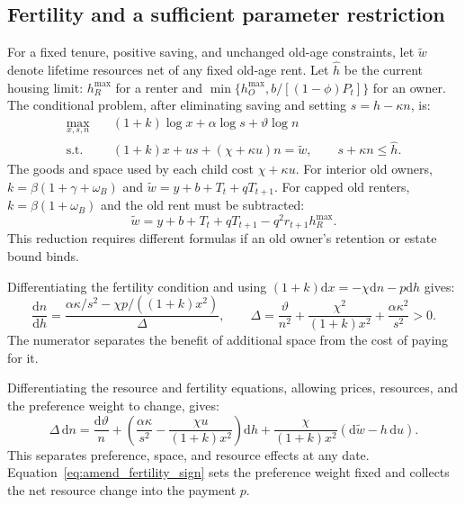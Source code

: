 \documentclass[11pt]{article}
\newcommand{\dd}{\mathrm d}
\begin{document}
\subsection{Fertility and a sufficient parameter restriction}
\label{app:amend_fertility}

For a fixed tenure, positive saving, and unchanged old-age constraints,
let $\widetilde w$ denote lifetime resources net of any fixed old-age rent.
Let $\widehat h$ be the current housing limit: $h_R^{\max}$ for a renter
and $\min\{h_O^{\max},b/[(1-\phi)P_t]\}$ for an owner. The conditional
problem, after eliminating saving and setting $s=h-\kappa n$, is:
\begin{equation}
 \begin{aligned}
 \max_{x,s,n}\quad &(1+k)\log x+\alpha\log s+\vartheta\log n\\
 \text{s.t.}\quad &(1+k)x+u s+(\chi+\kappa u)n=\widetilde w,
 \qquad s+\kappa n\leq\widehat h.
 \end{aligned}
 \label{eq:amend_reduced_problem}
\end{equation}
The goods and space used by each child cost $\chi+\kappa u$.
For interior old owners, $k=\beta(1+\gamma+\omega_B)$ and
$\widetilde w=y+b+T_t+qT_{t+1}$. For capped old renters,
$k=\beta(1+\omega_B)$ and the old rent must be subtracted:
\begin{equation}
 \widetilde w=y+b+T_t+qT_{t+1}-q^2r_{t+1}h_R^{\max}.
 \label{eq:amend_capped_old}
\end{equation}
This reduction requires different formulas if an old owner's retention or
estate bound binds.

Differentiating the fertility condition and using
$(1+k)\dd x=-\chi\dd n-p\dd h$ gives:
\begin{equation}
 \frac{\dd n}{\dd h}
 =\frac{\alpha\kappa/s^2-\chi p/((1+k)x^2)}{\Delta},\qquad
 \Delta=\frac{\vartheta}{n^2}+\frac{\chi^2}{(1+k)x^2}
              +\frac{\alpha\kappa^2}{s^2}>0.
 \label{eq:amend_fertility_sign}
\end{equation}
The numerator separates the benefit of additional space from the cost of
paying for it.

Differentiating the resource and fertility equations, allowing prices,
resources, and the preference weight to change, gives:
\begin{equation}
 \Delta\,\dd n=\frac{\dd\vartheta}{n}
 +\left(\frac{\alpha\kappa}{s^2}-\frac{\chi u}{(1+k)x^2}\right)\dd h
 +\frac{\chi}{(1+k)x^2}(\dd\widetilde w-h\,\dd u).
 \label{eq:amend_dated_fertility}
\end{equation}
This separates preference, space, and resource effects at any date.
Equation~\eqref{eq:amend_fertility_sign} sets the preference weight fixed and
collects the net resource change into the payment $p$.
\end{document}
